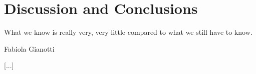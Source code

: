 \chapter{Discussion and Conclusions}

\epigraph{What we know is really very, very little compared to what we still have to know.}{Fabiola Gianotti}

[...]